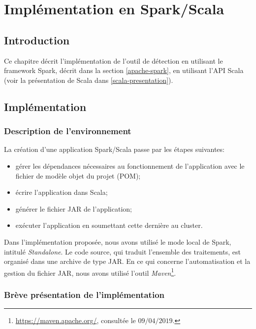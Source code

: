 \chapter{Implémentation  en Spark/Scala} \label{application:spark}

\section{Introduction}
Ce chapitre  décrit  l'implémentation de l'outil de détection en utilisant le framework Spark, décrit dans la section \ref{apache-spark}, en utilisant l'API Scala (voir la présentation de Scala dans \ref{scala-presentation}). 

\section{Implémentation}
\subsection{Description de l'environnement}
La création d'une application Spark/Scala passe par les étapes suivantes:
\begin{itemize}
	\item gérer les dépendances nécessaires au fonctionnement de l'application avec le fichier de modèle objet du projet (POM);
	\item écrire l'application dans Scala;
	\item générer le fichier JAR de l'application;
	 \item  exécuter l'application en soumettant cette dernière au cluster. 
\end{itemize}

Dans l'implémentation proposée, nous avons utilisé le mode local de Spark, intitulé \textit{Standalone}. 
Le code source, qui traduit l'ensemble des traitements, est organisé dans une archive de type JAR.
En ce qui concerne  l'automatisation et la gestion du fichier JAR, nous avons utilisé l'outil \textit{Maven}\footnote{\url{https://maven.apache.org/}, consultée le $09/04/2019$.}.


\subsection{Brève présentation  de l'implémentation}

